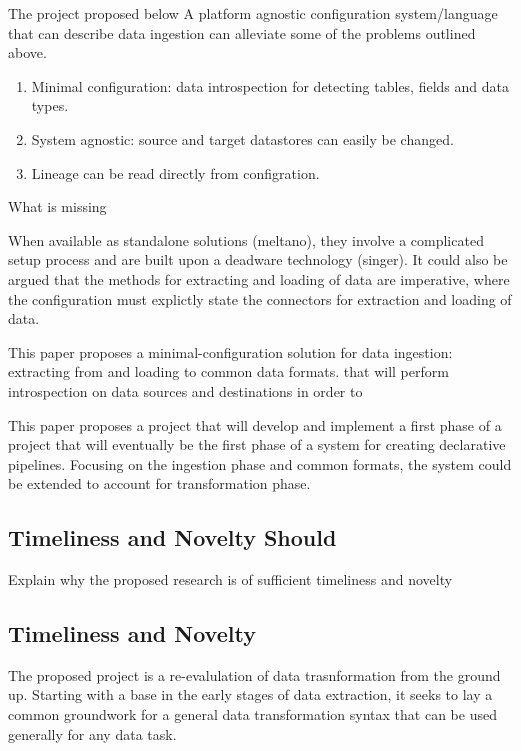 The project proposed below A platform agnostic configuration
system/language that can describe data ingestion can alleviate some of
the problems outlined above.

\begin{enumerate}
\def\labelenumi{\arabic{enumi}.}
\tightlist
\item
  Minimal configuration: data introspection for detecting tables, fields
  and data types.
\item
  System agnostic: source and target datastores can easily be changed.
\item
  Lineage can be read directly from configration.
\end{enumerate}

What is missing

When available as standalone solutions (meltano), they involve a
complicated setup process and are built upon a deadware technology
(singer). It could also be argued that the methods for extracting and
loading of data are imperative, where the configuration must explictly
state the connectors for extraction and loading of data.

This paper proposes a minimal-configuration solution for data ingestion:
extracting from and loading to common data formats. that will perform
introspection on data sources and destinations in order to

This paper proposes a project that will develop and implement a first
phase of a project that will eventually be the first phase of a system
for creating declarative pipelines. Focusing on the ingestion phase and
common formats, the system could be extended to account for
transformation phase.

\subsection{Timeliness and Novelty
Should}\label{timeliness-and-novelty-should}

Explain why the proposed research is of sufficient timeliness and
novelty

\subsection{Timeliness and Novelty}\label{timeliness-and-novelty}

The proposed project is a re-evalulation of data trasnformation from the
ground up. Starting with a base in the early stages of data extraction,
it seeks to lay a common groundwork for a general data transformation
syntax that can be used generally for any data task.

